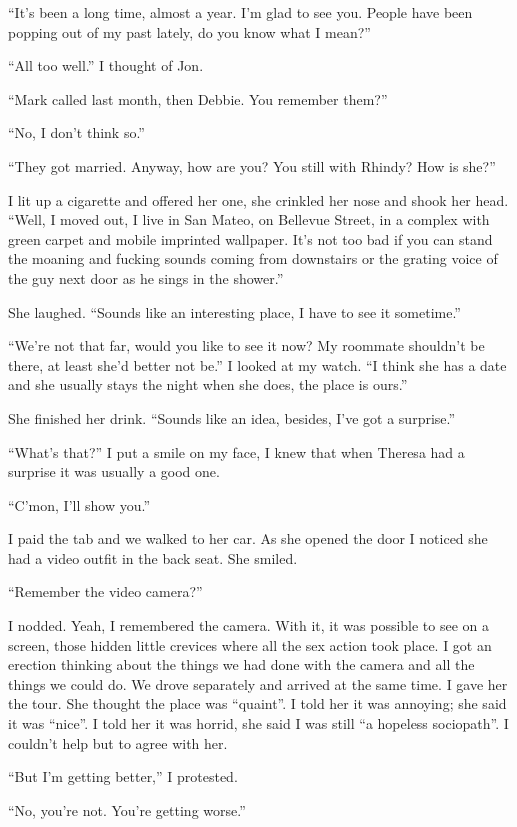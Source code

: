 ``It's been a long time, almost a year. I'm glad to see you. People have
been popping out of my past lately, do you know what I mean?''

``All too well.'' I thought of Jon.

``Mark called last month, then Debbie. You remember them?''

``No, I don't think so.''

``They got married. Anyway, how are you? You still with Rhindy? How is
she?''

I lit up a cigarette and offered her one, she crinkled her nose and
shook her head. ``Well, I moved out, I live in San Mateo, on Bellevue
Street, in a complex with green carpet and mobile imprinted wallpaper.
It's not too bad if you can stand the moaning and fucking sounds coming
from downstairs or the grating voice of the guy next door as he sings in
the shower.''

She laughed. ``Sounds like an interesting place, I have to see it
sometime.''

``We're not that far, would you like to see it now? My roommate
shouldn't be there, at least she'd better not be.'' I looked at my
watch. ``I think she has a date and she usually stays the night when she
does, the place is ours.''

She finished her drink. ``Sounds like an idea, besides, I've got a
surprise.''

``What's that?'' I put a smile on my face, I knew that when Theresa had
a surprise it was usually a good one.

``C'mon, I'll show you.''

I paid the tab and we walked to her car. As she opened the door I
noticed she had a video outfit in the back seat. She smiled.

``Remember the video camera?''

I nodded. Yeah, I remembered the camera. With it, it was possible to see
on a screen, those hidden little crevices where all the sex action took
place. I got an erection thinking about the things we had done with the
camera and all the things we could do. We drove separately and arrived
at the same time. I gave her the tour. She thought the place was
``quaint''. I told her it was annoying; she said it was ``nice''. I told
her it was horrid, she said I was still ``a hopeless sociopath''. I
couldn't help but to agree with her.

``But I'm getting better,'' I protested.

``No, you're not. You're getting worse.''

